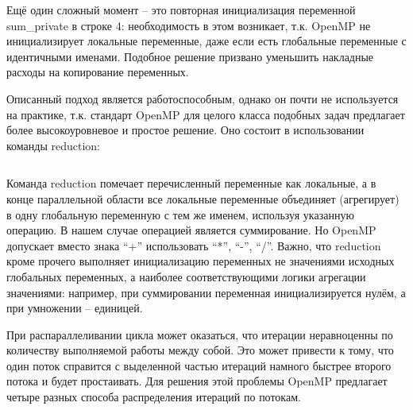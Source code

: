 Ещё один сложный момент – это повторная инициализация переменной sum\_private в строке 4: необходимость в этом возникает, т.к. OpenMP не инициализирует локальные переменные, даже если есть глобальные переменные с идентичными именами. Подобное решение призвано уменьшить накладные расходы на копирование переменных.

Описанный подход является работоспособным, однако он почти не используется на практике, т.к. стандарт OpenMP для целого класса подобных задач предлагает более высокоуровневое и простое решение. Оно состоит в использовании команды reduction:

\inputminted{c++}{listings/OpenMPExample12.cpp}

Команда reduction помечает перечисленный переменные как локальные, а в конце параллельной области все локальные переменные объединяет (агрегирует) в одну глобальную переменную с тем же именем, используя указанную операцию. В нашем случае операцией является суммирование. Но OpenMP допускает вместо знака ``+'' использовать ``*'', ``-'', ``/''. Важно, что reduction кроме прочего выполняет инициализацию переменных не значениями исходных глобальных переменных, а наиболее соответствующими логики агрегации значениями: например, при суммировании переменная инициализируется нулём, а при умножении – единицей.

При распараллеливании цикла может оказаться, что итерации не\-рав\-но\-цен\-ны по количеству выполняемой работы между собой. Это может привести к тому, что один поток справится с выделенной частью итераций намного быстрее второго потока и будет простаивать. Для решения этой проблемы OpenMP предлагает четыре разных способа распределения итераций по потокам. 

